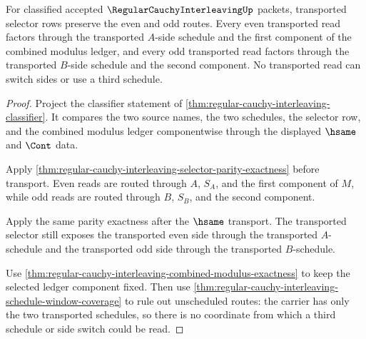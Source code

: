 \begin{theorem}
\label{thm:regular-cauchy-interleaving-selector-transport-determinacy}
For classified accepted $\RegularCauchyInterleavingUp$ packets, transported selector rows preserve the even and odd routes. Every even transported read factors through the transported $A$-side schedule and the first component of the combined modulus ledger, and every odd transported read factors through the transported $B$-side schedule and the second component. No transported read can switch sides or use a third schedule.
\end{theorem}
\begin{proof}
Project the classifier statement of \autoref{thm:regular-cauchy-interleaving-classifier}. It compares the two source names, the two schedules, the selector row, and the combined modulus ledger componentwise through the displayed $\hsame$ and $\Cont$ data.

Apply \autoref{thm:regular-cauchy-interleaving-selector-parity-exactness} before transport. Even reads are routed through $A$, $S_A$, and the first component of $M$, while odd reads are routed through $B$, $S_B$, and the second component.

Apply the same parity exactness after the $\hsame$ transport. The transported selector still exposes the transported even side through the transported $A$-schedule and the transported odd side through the transported $B$-schedule.

Use \autoref{thm:regular-cauchy-interleaving-combined-modulus-exactness} to keep the selected ledger component fixed. Then use \autoref{thm:regular-cauchy-interleaving-schedule-window-coverage} to rule out unscheduled routes: the carrier has only the two transported schedules, so there is no coordinate from which a third schedule or side switch could be read.
\end{proof}

